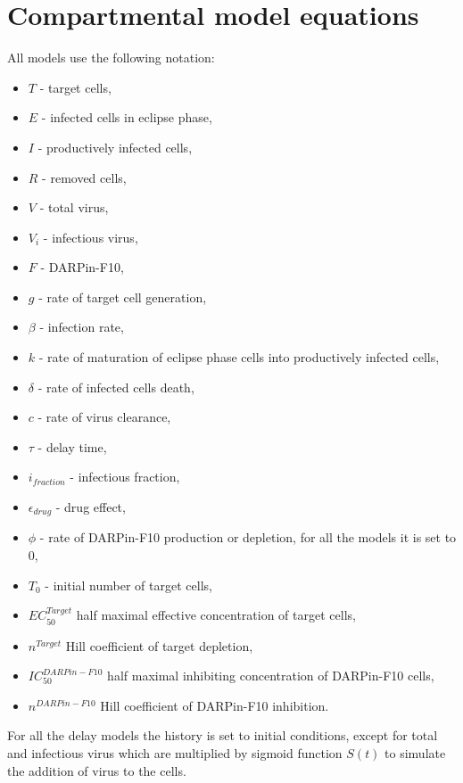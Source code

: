 \section{Compartmental model equations}
\label{appendix:compartmentalModelEquations}

All models use the following notation:

\begin{itemize}
\item $T$ - target cells,
\item $E$ - infected cells in eclipse phase,
\item $I$ - productively infected cells,
\item $R$ - removed cells,
\item $V$ - total virus,
\item $V_i$ - infectious virus,
\item $F$ - DARPin-F10,
\item $g$ - rate of target cell generation,
\item $\beta$ - infection rate,
\item $k$ - rate of maturation of eclipse phase cells into productively infected cells,
\item $\delta$ - rate of infected cells death,
\item $c$ - rate of virus clearance,
\item $\tau$ - delay time,
\item $i_{fraction}$ - infectious fraction,
\item $\epsilon_{drug}$ - drug effect,
\item $\phi$ - rate of DARPin-F10 production or depletion, for all the models it is set to 0,
\item $T_0$ - initial number of target cells,
\item $EC_{50}^{Target}$ half maximal effective concentration of target cells,
\item $n^{Target}$ Hill coefficient of target depletion,
\item $IC_{50}^{DARPin-F10}$ half maximal inhibiting concentration of DARPin-F10 cells,
\item $n^{DARPin-F10}$ Hill coefficient of DARPin-F10 inhibition.
\end{itemize}

For all the delay models the history is set to initial conditions, except for total and infectious virus which are multiplied by sigmoid function $S(t)$ to simulate the addition of virus to the cells.

